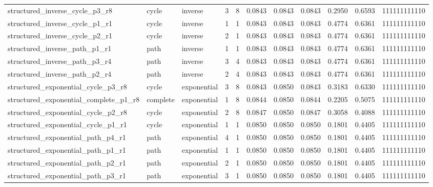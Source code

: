 \begin{tabular}{lllrrrrrrrl}
structured\_inverse\_cycle\_p3\_r8 & cycle & inverse & 3 & 8 & 0.0843 & 0.0843 & 0.0843 & 0.2950 & 0.6593 & 111111111110 \\
structured\_inverse\_cycle\_p1\_r1 & cycle & inverse & 1 & 1 & 0.0843 & 0.0843 & 0.0843 & 0.4774 & 0.6361 & 111111111110 \\
structured\_inverse\_cycle\_p2\_r1 & cycle & inverse & 2 & 1 & 0.0843 & 0.0843 & 0.0843 & 0.4774 & 0.6361 & 111111111110 \\
structured\_inverse\_path\_p1\_r1 & path & inverse & 1 & 1 & 0.0843 & 0.0843 & 0.0843 & 0.4774 & 0.6361 & 111111111110 \\
structured\_inverse\_path\_p3\_r4 & path & inverse & 3 & 4 & 0.0843 & 0.0843 & 0.0843 & 0.4774 & 0.6361 & 111111111110 \\
structured\_inverse\_path\_p2\_r4 & path & inverse & 2 & 4 & 0.0843 & 0.0843 & 0.0843 & 0.4774 & 0.6361 & 111111111110 \\
structured\_exponential\_cycle\_p3\_r8 & cycle & exponential & 3 & 8 & 0.0843 & 0.0850 & 0.0843 & 0.3183 & 0.6330 & 111111111110 \\
structured\_exponential\_complete\_p1\_r8 & complete & exponential & 1 & 8 & 0.0844 & 0.0850 & 0.0844 & 0.2205 & 0.5075 & 111111111110 \\
structured\_exponential\_cycle\_p2\_r8 & cycle & exponential & 2 & 8 & 0.0847 & 0.0850 & 0.0847 & 0.3058 & 0.4088 & 111111111110 \\
structured\_exponential\_cycle\_p1\_r1 & cycle & exponential & 1 & 1 & 0.0850 & 0.0850 & 0.0850 & 0.1801 & 0.4405 & 111111111110 \\
structured\_exponential\_path\_p4\_r1 & path & exponential & 4 & 1 & 0.0850 & 0.0850 & 0.0850 & 0.1801 & 0.4405 & 111111111110 \\
structured\_exponential\_path\_p1\_r1 & path & exponential & 1 & 1 & 0.0850 & 0.0850 & 0.0850 & 0.1801 & 0.4405 & 111111111110 \\
structured\_exponential\_path\_p2\_r1 & path & exponential & 2 & 1 & 0.0850 & 0.0850 & 0.0850 & 0.1801 & 0.4405 & 111111111110 \\
structured\_exponential\_path\_p3\_r1 & path & exponential & 3 & 1 & 0.0850 & 0.0850 & 0.0850 & 0.1801 & 0.4405 & 111111111110 \\
\bottomrule
\end{tabular}
